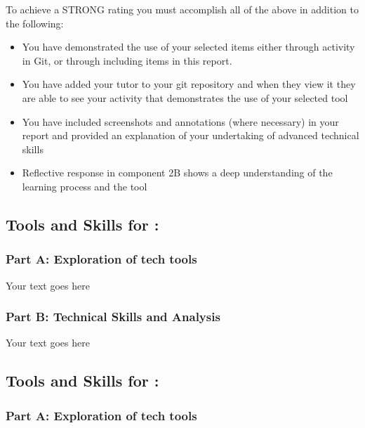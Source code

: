\documentclass[a4paper, 11pt]{report}
\begin{document}
\begin{enumerate}
To achieve a STRONG rating you must accomplish all of the above in addition to the following:
\begin{itemize}
    \item You have demonstrated the use of your selected items either through activity in Git, or through including items in this report.
    \item You have added your tutor to your git repository and when they view it they are able to see your activity that demonstrates the use of your selected tool
    \item You have included screenshots and annotations (where necessary) in your report and provided an explanation of your undertaking of advanced technical skills
    \item Reflective response in component 2B shows a deep understanding of the learning process and the tool
\end{itemize}

\vspace{4ex}


\subsection{Tools and Skills for \majA: \studA}

\subsubsection{Part A: Exploration of tech tools}

Your text goes here

\subsubsection{Part B: Technical Skills and Analysis}

Your text goes here




\subsection{Tools and Skills for \majB: \studB}

\subsubsection{Part A: Exploration of tech tools}


\end{enumerate}
\end{document}
